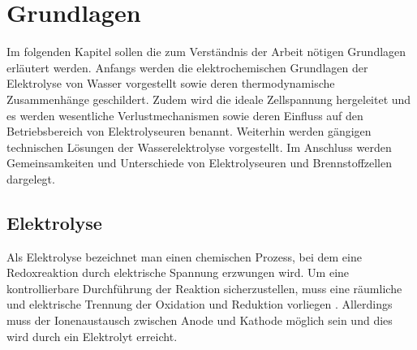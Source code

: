 \chapter{Grundlagen}
\label{cha:Grundlagen}
Im folgenden Kapitel sollen die zum Verständnis der Arbeit nötigen Grundlagen erläutert werden. Anfangs werden die elektrochemischen Grundlagen der Elektrolyse von Wasser vorgestellt sowie deren thermodynamische Zusammenhänge geschildert. Zudem wird die ideale Zellspannung hergeleitet und es werden wesentliche Verlustmechanismen sowie deren Einfluss auf den Betriebsbereich von Elektrolyseuren benannt. Weiterhin werden gängigen technischen Lösungen der Wasserelektrolyse vorgestellt. Im Anschluss werden Gemeinsamkeiten und Unterschiede von Elektrolyseuren und Brennstoffzellen dargelegt. \\


\section{Elektrolyse}
\label{sec:Elektrolyse}
Als Elektrolyse bezeichnet man einen chemischen Prozess, bei dem eine Redoxreaktion durch elektrische Spannung erzwungen wird. 
Um eine kontrollierbare Durchführung der Reaktion sicherzustellen, muss eine räumliche und elektrische Trennung der Oxidation und Reduktion vorliegen \cite{ISBN 978-3-95806-217-7}. Allerdings muss der Ionenaustausch zwischen Anode und Kathode möglich sein und dies wird durch ein Elektrolyt erreicht.

